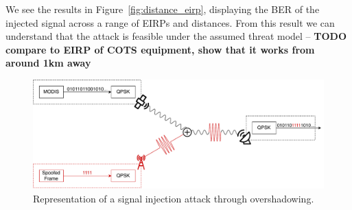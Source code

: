 We see the results in Figure~\ref{fig:distance_eirp}, displaying the BER of the injected signal across a range of EIRPs and distances.
From this result we can understand that the attack is feasible under the assumed threat model -- \textbf{TODO compare to EIRP of COTS equipment, show that it works from around 1km away}




\begin{figure}
    \centering
    \includegraphics[width=\columnwidth]{diagrams/overshadowing_demo.pdf}
    \caption{Representation of a signal injection attack through overshadowing.}
    \label{fig:overshadowing_demo}
\end{figure}

